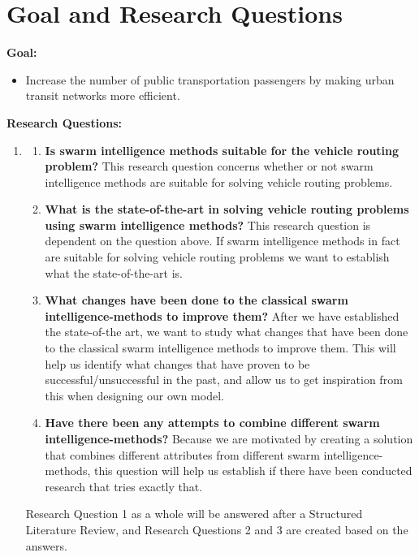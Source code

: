 \section{Goal and Research Questions}
\textbf{Goal:}
\begin{itemize}
\item \label{itm:goal} Increase the number of public transportation passengers by making urban transit networks more efficient.
\end{itemize}
\textbf{Research Questions:}
\begin{enumerate}[label=\textbf{\arabic*})]
\item \label{itm:1}
    \begin{enumerate}
    \item \label{itm:1a} \textbf{Is swarm intelligence methods suitable for the vehicle routing problem?}\newline
    This research question concerns whether or not swarm intelligence methods are suitable for solving vehicle routing problems. 
    \item \label{itm:1b} \textbf{What is the state-of-the-art in solving vehicle routing problems using swarm intelligence methods?}\newline
    This research question is dependent on the question above. If swarm intelligence methods in fact are suitable for solving vehicle routing problems we want to establish what the state-of-the-art is. 
    \item \label{itm:1c} \textbf{What changes have been done to the classical swarm intelligence-methods to improve them?}\newline
    After we have established the state-of-the art, we want to study what changes that have been done to the classical swarm intelligence methods to improve them. This will help us identify what changes that have proven to be successful/unsuccessful in the past, and allow us to get inspiration from this when designing our own model.  
    \item \label{itm:1d}\textbf{Have there been any attempts to combine different swarm intelligence-methods?} \newline
    Because we are motivated by creating a solution that combines different attributes from different swarm intelligence-methods, this question will help us establish if there have been conducted research that tries exactly that. 
	\end{enumerate}
    Research Question 1 as a whole will be answered after a Structured Literature Review, and Research Questions 2 and 3 are created based on the answers. 

\end{enumerate}
